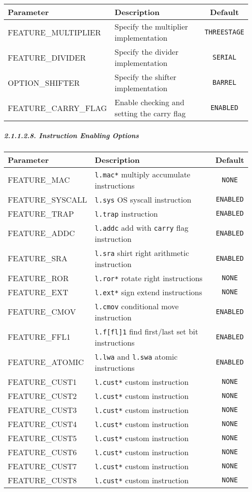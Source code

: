 \documentclass[]{article}
\let\oldsubparagraph\subparagraph
\renewcommand{\subparagraph}[1]{\oldsubparagraph{#1}\mbox{}}
\begin{document}
\begin{longtable}[]{@{}llc@{}}
\toprule
Parameter & Description & Default\tabularnewline
\midrule
\endhead
FEATURE\_MULTIPLIER & Specify the multiplier implementation &
\texttt{THREESTAGE}\tabularnewline
FEATURE\_DIVIDER & Specify the divider implementation &
\texttt{SERIAL}\tabularnewline
OPTION\_SHIFTER & Specify the shifter implementation &
\texttt{BARREL}\tabularnewline
FEATURE\_CARRY\_FLAG & Enable checking and setting the carry flag &
\texttt{ENABLED}\tabularnewline
\bottomrule
\end{longtable}

\subparagraph{2.1.1.2.8. Instruction Enabling
Options}\label{instruction-enabling-options}

\begin{longtable}[]{@{}llc@{}}
\toprule
Parameter & Description & Default\tabularnewline
\midrule
\endhead
FEATURE\_MAC & \texttt{l.mac*} multiply accumulate instructions &
\texttt{NONE}\tabularnewline
FEATURE\_SYSCALL & \texttt{l.sys} OS syscall instruction &
\texttt{ENABLED}\tabularnewline
FEATURE\_TRAP & \texttt{l.trap} instruction &
\texttt{ENABLED}\tabularnewline
FEATURE\_ADDC & \texttt{l.addc} add with \texttt{carry} flag instruction
& \texttt{ENABLED}\tabularnewline
FEATURE\_SRA & \texttt{l.sra} shirt right arithmetic instruction &
\texttt{ENABLED}\tabularnewline
FEATURE\_ROR & \texttt{l.ror*} rotate right instructions &
\texttt{NONE}\tabularnewline
FEATURE\_EXT & \texttt{l.ext*} sign extend instructions &
\texttt{NONE}\tabularnewline
FEATURE\_CMOV & \texttt{l.cmov} conditional move instruction &
\texttt{ENABLED}\tabularnewline
FEATURE\_FFL1 & \texttt{l.f{[}fl{]}1} find first/last set bit
instructions & \texttt{ENABLED}\tabularnewline
FEATURE\_ATOMIC & \texttt{l.lwa} and \texttt{l.swa} atomic instructions
& \texttt{ENABLED}\tabularnewline
FEATURE\_CUST1 & \texttt{l.cust*} custom instruction &
\texttt{NONE}\tabularnewline
FEATURE\_CUST2 & \texttt{l.cust*} custom instruction &
\texttt{NONE}\tabularnewline
FEATURE\_CUST3 & \texttt{l.cust*} custom instruction &
\texttt{NONE}\tabularnewline
FEATURE\_CUST4 & \texttt{l.cust*} custom instruction &
\texttt{NONE}\tabularnewline
FEATURE\_CUST5 & \texttt{l.cust*} custom instruction &
\texttt{NONE}\tabularnewline
FEATURE\_CUST6 & \texttt{l.cust*} custom instruction &
\texttt{NONE}\tabularnewline
FEATURE\_CUST7 & \texttt{l.cust*} custom instruction &
\texttt{NONE}\tabularnewline
FEATURE\_CUST8 & \texttt{l.cust*} custom instruction &
\texttt{NONE}\tabularnewline
\bottomrule
\end{longtable}
\end{document}
